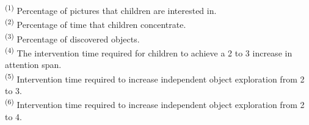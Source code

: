 
\begin{tableorg}
    \caption{Comparison of expert survey results and eye tracking solution application results – subject 1}
    \small
    \label{tb9}
    \renewcommand{\arraystretch}{2.3}
    \centering
    
    \vspace{2mm}
    \parbox{\linewidth}{
    \footnotesize
    \textsuperscript{(1)} Percentage of pictures that children are interested in. \\
    \textsuperscript{(2)} Percentage of time that children concentrate.\\
    \textsuperscript{(3)} Percentage of discovered objects. \\
    \textsuperscript{(4)} The intervention time required for children to achieve a 2 to 3 increase in attention span. \\
    \textsuperscript{(5)} Intervention time required to increase independent object exploration from 2 to 3. \\
    \textsuperscript{(6)} Intervention time required to increase independent object exploration from 2 to 4.}
\end{tableorg}

